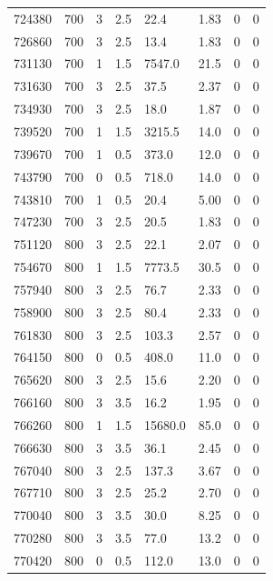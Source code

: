 \documentclass[preview]{standalone}
\begin{document}
{{{{{{{{\begin{tabular}{L{1.2cm}C{1.2cm} C{0.3cm}C{0.5cm} C{1.4cm}C{1.4cm} C{1.4cm}C{1.4cm}}
  724380  &   700  & 3     & 2.5 &  22.4  & 1.83  & 0 &  0   \\ 
  726860  &   700  & 3     & 2.5 &  13.4  & 1.83  & 0 &  0   \\ 
  731130  &   700  & 1     & 1.5 &  7547.0  & 21.5  & 0 &  0   \\ 
  731630  &   700  & 3     & 2.5 &  37.5  & 2.37  & 0 &  0   \\ 
  734930  &   700  & 3     & 2.5 &  18.0  & 1.87  & 0 &  0   \\ 
  739520  &   700  & 1     & 1.5 &  3215.5  & 14.0  & 0 &  0   \\ 
  739670  &   700  & 1     & 0.5 &  373.0  & 12.0  & 0 &  0   \\ 
  743790  &   700  & 0     & 0.5 &  718.0  & 14.0  & 0 &  0   \\ 
  743810  &   700  & 1     & 0.5 &  20.4  & 5.00  & 0 &  0   \\ 
  747230  &   700  & 3     & 2.5 &  20.5  & 1.83  & 0 &  0   \\ 
  751120  &   800  & 3     & 2.5 &  22.1  & 2.07  & 0 &  0   \\ 
  754670  &   800  & 1     & 1.5 &  7773.5  & 30.5  & 0 &  0   \\ 
  757940  &   800  & 3     & 2.5 &  76.7  & 2.33  & 0 &  0   \\ 
  758900  &   800  & 3     & 2.5 &  80.4  & 2.33  & 0 &  0   \\ 
  761830  &   800  & 3     & 2.5 &  103.3  & 2.57  & 0 &  0   \\ 
  764150  &   800  & 0     & 0.5 &  408.0  & 11.0  & 0 &  0   \\ 
  765620  &   800  & 3     & 2.5 &  15.6  & 2.20  & 0 &  0   \\ 
  766160  &   800  & 3     & 3.5 &  16.2  & 1.95  & 0 &  0   \\ 
  766260  &   800  & 1     & 1.5 &  15680.0  & 85.0  & 0 &  0   \\ 
  766630  &   800  & 3     & 3.5 &  36.1  & 2.45  & 0 &  0   \\ 
  767040  &   800  & 3     & 2.5 &  137.3  & 3.67  & 0 &  0   \\ 
  767710  &   800  & 3     & 2.5 &  25.2  & 2.70  & 0 &  0   \\ 
  770040  &   800  & 3     & 3.5 &  30.0  & 8.25  & 0 &  0   \\ 
  770280  &   800  & 3     & 3.5 &  77.0  & 13.2  & 0 &  0   \\ 
  770420  &   800  & 0     & 0.5 &  112.0  & 13.0  & 0 &  0   \\ 
\hline 
\end{tabular} 

}}}}}}}}
\end{document}
